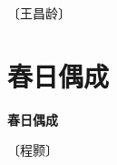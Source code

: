 \documentclass[12pt,UTF-8,openany,fontset=none]{ctexbook}
\begin{document}
\begin{center}
    \vspace{10pt}
    
    \begin{large}
        
        〔王昌龄〕
        
    \end{large}
    
    \vspace{8pt}
    
    \begin{huge}
        
        \phantom{。}

        \phantom{。}
        
        \phantom{。}

        \phantom{。}
        
    \end{huge}
    
\end{center}

\vspace{8pt}
\clearpage

\section{春日偶成}



\begin{center}
    {\bfseries 春日偶成}
\end{center}

\begin{center}
    \vspace{10pt}
    
    \begin{large}
        
        〔程颢〕
        
    \end{large}
    
    \vspace{8pt}
    
    \begin{huge}
        
        \phantom{。}

        \phantom{。}
        
        \phantom{。}

        \phantom{。}~~
        
    \end{huge}
    
\end{center}
\end{document}
